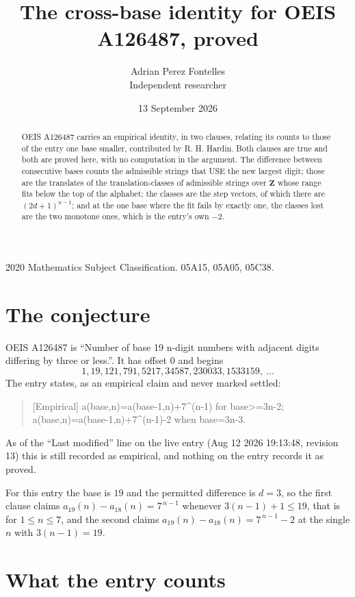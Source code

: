 \documentclass[11pt,a4paper]{article}
\title{The cross-base identity for OEIS A126487, proved}
\author{Adrian Perez Fontelles\\ \small Independent researcher}
\date{13 September 2026}
\theoremstyle{plain}
\theoremstyle{definition}
\begin{document}
\maketitle

\begin{abstract}
OEIS A126487 carries an empirical identity, in two clauses, relating its counts to those of the
entry one base smaller, contributed by R. H. Hardin. Both clauses are true and both are proved
here, with no computation in the argument. The difference between consecutive bases counts the
admissible strings that USE the new largest digit; those are the translates of the
translation-classes of admissible strings over $\mathbf{Z}$ whose range fits below the top of
the alphabet; the classes are the step vectors, of which there are $(2d+1)^{n-1}$; and at the
one base where the fit fails by exactly one, the classes lost are the two monotone ones, which
is the entry's own $-2$.
\end{abstract}

\noindent\small 2020 Mathematics Subject Classification. 05A15, 05A05, 05C38.\normalsize

\section{The conjecture}

OEIS A126487 is ``Number of base 19 n-digit numbers with adjacent digits differing by three or less.''. It has offset $0$ and begins
\[
1, 19, 121, 791, 5217, 34587, 230033, 1533159,\ \dots
\]
The entry states, as an empirical claim and never marked settled:
\begin{quote}
[Empirical] a(base,n)=a(base-1,n)+7\textasciicircum{}(n-1) for base>=3n-2; a(base,n)=a(base-1,n)+7\textasciicircum{}(n-1)-2 when base=3n-3.
\end{quote}
As of the ``Last modified'' line on the live entry (Aug 12 2026 19:13:48, revision 13)
this is still recorded as empirical, and nothing on the entry records it as proved.

For this entry the base is $19$ and the permitted difference is $d=3$, so the first clause
claims $a_{19}(n)-a_{18}(n)=7^{\,n-1}$ whenever $3(n-1)+1\le19$, that is for
$1\le n\le7$, and the second claims $a_{19}(n)-a_{18}(n)=7^{\,n-1}-2$ at the single
$n$ with $3(n-1)=19$.

\section{What the entry counts}
\end{document}
